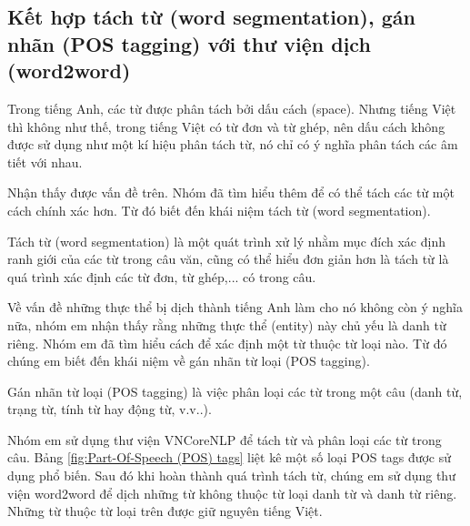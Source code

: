\subsection{Kết hợp tách từ (word segmentation), gán nhãn (POS tagging) với thư viện dịch (word2word)}

Trong tiếng Anh, các từ được phân tách bởi dấu cách (space). Nhưng tiếng Việt thì không như thế, trong tiếng Việt có từ đơn và từ ghép, nên dấu cách không được sử dụng như một kí hiệu phân tách từ, nó chỉ có ý nghĩa phân tách các âm tiết với nhau. 

Nhận thấy được vấn đề trên. Nhóm đã tìm hiểu thêm để có thể tách các từ một cách chính xác hơn. Từ đó biết đến khái niệm tách từ (word segmentation). 

Tách từ (word segmentation) là một quát trình xử lý nhằm mục đích xác định ranh giới của các từ trong câu văn, cũng có thể hiểu đơn giản hơn là tách từ là quá trình xác định các từ đơn, từ ghép,... có trong câu.

Về vấn đề những thực thể bị dịch thành tiếng Anh làm cho nó không còn ý nghĩa nữa, nhóm em nhận thấy rằng những thực thể (entity) này chủ yếu là danh từ riêng. Nhóm em đã tìm hiểu  cách để xác định một từ thuộc từ loại nào. Từ đó chúng em biết đến khái niệm về gán nhãn từ loại (POS tagging).

Gán nhãn từ loại (POS tagging) là việc phân loại các từ trong một câu (danh từ, trạng từ, tính từ hay động từ, v.v..).

Nhóm em sử dụng thư viện VNCoreNLP để tách từ và phân loại các từ trong câu. Bảng \ref{fig:Part-Of-Speech (POS) tags} liệt kê một số loại POS tags được sử dụng phổ biến. Sau đó khi hoàn thành quá trình tách từ, chúng em sử dụng thư viện word2word để dịch những từ không thuộc từ loại danh từ và danh từ riêng. Những từ thuộc từ loại trên được giữ nguyên tiếng Việt.


